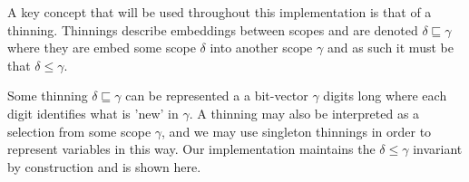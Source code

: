 
A key concept that will be used throughout this implementation is that
of a thinning. Thinnings describe embeddings between scopes and are
denoted $δ ⊑ γ$ where they are embed some scope $δ$ into another
scope $γ$ and as such it must be that $δ \leq γ$.

Some thinning $δ ⊑ γ$ can be represented a a bit-vector $γ$ digits long where
each digit identifies what is 'new' in $γ$. A thinning may also be interpreted
as a selection from some scope $γ$, and we may use singleton thinnings in order
to represent variables in this way. Our implementation maintains the $δ \leq γ$
invariant by construction and is shown here.

